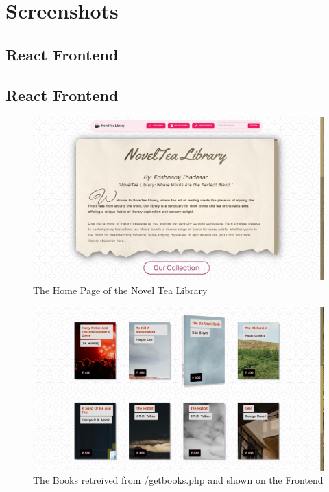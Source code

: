 \documentclass[11pt]{article}
\begin{document}
\section{Screenshots}

\subsection{React Frontend}

\subsection{React Frontend}
\begin{figure}[H]
    \centering
    \includegraphics[width=.95\textwidth]{Screenshots/home.png}
    \caption{The Home Page of the Novel Tea Library}
\end{figure}

\begin{figure}[H]
    \centering
    \includegraphics[width=.95\textwidth]{Screenshots/books.png}
    \caption{The Books retreived from /getbooks.php and shown on the Frontend}
\end{figure}
\end{document}
